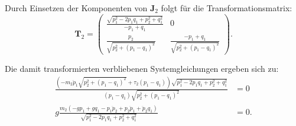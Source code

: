 Durch Einsetzen der Komponenten von $\mathbf{J}_2$ folgt für die Transformationsmatrix:
\begin{equation}
	\mathbf{T}_2 =
	\left(\begin{matrix}
	\frac{\sqrt{p_{1}^{2} - 2 p_{1} q_{1} + p_{2}^{2} + q_{1}^{2}}}{- p_{1} + q_{1}} & 0\\
	\frac{p_{2}}{\sqrt{p_{2}^{2} + \left(p_{1} - q_{1}\right)^{2}}} & \frac{- p_{1} + q_{1}}{\sqrt{p_{2}^{2} + \left(p_{1} - q_{1}\right)^{2}}}
	\end{matrix}\right).
\end{equation}

Die damit transformierten verbliebenen Systemgleichungen ergeben sich zu:
\begin{subequations}
	\begin{align}
	\frac{\left(- m_{2} \ddot{p}_{1} \sqrt{p_{2}^{2} + \left(p_{1} - q_{1}\right)^{2}} + \tau_{2} \left(p_{1} - q_{1}\right)\right) \sqrt{p_{1}^{2} - 2 p_{1} q_{1} + p_{2}^{2} + q_{1}^{2}}}{\left(p_{1} - q_{1}\right) \sqrt{p_{2}^{2} + \left(p_{1} - q_{1}\right)^{2}}} &= 0 \label{single_flat_transformed_syseq1}\\
	g\frac{m_{2} \left(- g p_{1} + g q_{1} - p_{1} \ddot{p}_{2} + p_{2} \ddot{p}_{1} + \ddot{p}_{2} q_{1}\right)}{\sqrt{p_{1}^{2} - 2 p_{1} q_{1} + p_{2}^{2} + q_{1}^{2}}}
	 &= 0\label{single_flat_transformed_syseq2}.
	\end{align}
\end{subequations}

